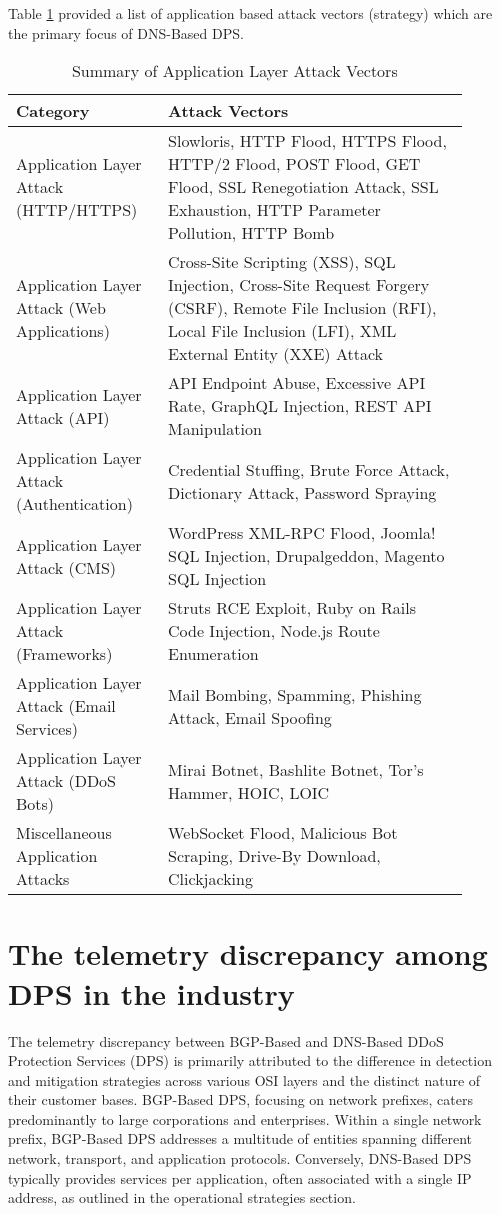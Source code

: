 Table \ref{tab:application_attacks} provided a list of application based attack vectors (strategy) \cite{zolotukhin2018data } which are the primary focus of DNS-Based DPS.

\begin{table}[!htbp]
\centering
\caption{Summary of Application Layer Attack Vectors}
\begin{tabular}{|p{0.3\linewidth}|p{0.6\linewidth}|}
\hline
\textbf{Category} & \textbf{Attack Vectors} \\
\hline
Application Layer Attack (HTTP/HTTPS) & Slowloris, HTTP Flood, HTTPS Flood, HTTP/2 Flood, POST Flood, GET Flood, SSL Renegotiation Attack, SSL Exhaustion, HTTP Parameter Pollution, HTTP Bomb \\
\hline
Application Layer Attack (Web Applications) & Cross-Site Scripting (XSS), SQL Injection, Cross-Site Request Forgery (CSRF), Remote File Inclusion (RFI), Local File Inclusion (LFI), XML External Entity (XXE) Attack \\
\hline
Application Layer Attack (API) & API Endpoint Abuse, Excessive API Rate, GraphQL Injection, REST API Manipulation \\
\hline
Application Layer Attack (Authentication) & Credential Stuffing, Brute Force Attack, Dictionary Attack, Password Spraying \\
\hline
Application Layer Attack (CMS) & WordPress XML-RPC Flood, Joomla! SQL Injection, Drupalgeddon, Magento SQL Injection \\
\hline
Application Layer Attack (Frameworks) & Struts RCE Exploit, Ruby on Rails Code Injection, Node.js Route Enumeration \\
\hline
Application Layer Attack (Email Services) & Mail Bombing, Spamming, Phishing Attack, Email Spoofing \\
\hline
Application Layer Attack (DDoS Bots) & Mirai Botnet, Bashlite Botnet, Tor's Hammer, HOIC, LOIC \\
\hline
Miscellaneous Application Attacks & WebSocket Flood, Malicious Bot Scraping, Drive-By Download, Clickjacking \\
\hline
\end{tabular}
\label{tab:application_attacks}
\end{table}


\section{The telemetry discrepancy among DPS in the industry}\label{sec:telemetry}
The telemetry discrepancy between BGP-Based and DNS-Based DDoS Protection Services (DPS) is primarily attributed to the difference in detection and mitigation strategies across various OSI layers and the distinct nature of their customer bases. BGP-Based DPS, focusing on network prefixes, caters predominantly to large corporations and enterprises. Within a single network prefix, BGP-Based DPS addresses a multitude of entities spanning different network, transport, and application protocols. Conversely, DNS-Based DPS typically provides services per application, often associated with a single IP address, as outlined in the operational strategies section. 

